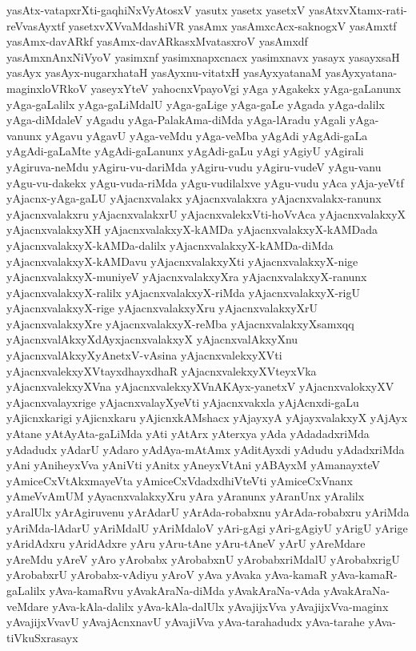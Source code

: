 {yasAtx-vatapxrXti-gaqhiNxVyAtosxV
yasutx
yasetx
yasetxV
yasAtxvXtamx-rati-reVvasAyxtf
yasetxvXVvaMdashiVR
yasAmx
yasAmxcAcx-saknogxV
yasAmxtf
yasAmx-davARkf
yasAmx-davARkasxMvatasxroV
yasAmxdf
yasAmxnAnxNiVyoV
yasimxnf
yasimxnapxcnacx
yasimxnavx
yasayx
yasayxsaH
yasAyx
yasAyx-nugarxhataH
yasAyxnu-vitatxH
yasAyxyatanaM
yasAyxyatana-maginxloVRkoV
yaseyxYteV
yahocnxVpayoVgi
yAga
yAgakekx
yAga-gaLanunx
yAga-gaLalilx
yAga-gaLiMdalU
yAga-gaLige
yAga-gaLe
yAgada
yAga-dalilx
yAga-diMdaleV
yAgadu
yAga-PalakAma-diMda
yAga-lAradu
yAgali
yAga-vanunx
yAgavu
yAgavU
yAga-veMdu
yAga-veMba
yAgAdi
yAgAdi-gaLa
yAgAdi-gaLaMte
yAgAdi-gaLanunx
yAgAdi-gaLu
yAgi
yAgiyU
yAgirali
yAgiruva-neMdu
yAgiru-vu-dariMda
yAgiru-vudu
yAgiru-vudeV
yAgu-vanu
yAgu-vu-dakekx
yAgu-vuda-riMda
yAgu-vudilalxve
yAgu-vudu
yAca
yAja-yeVtf
yAjacnx-yAga-gaLU
yAjacnxvalakx
yAjacnxvalakxra
yAjacnxvalakx-ranunx
yAjacnxvalakxru
yAjacnxvalakxrU
yAjacnxvalekxVti-hoVvAca
yAjacnxvalakxyX
yAjacnxvalakxyXH
yAjacnxvalakxyX-kAMDa
yAjacnxvalakxyX-kAMDada
yAjacnxvalakxyX-kAMDa-dalilx
yAjacnxvalakxyX-kAMDa-diMda
yAjacnxvalakxyX-kAMDavu
yAjacnxvalakxyXti
yAjacnxvalakxyX-nige
yAjacnxvalakxyX-muniyeV
yAjacnxvalakxyXra
yAjacnxvalakxyX-ranunx
yAjacnxvalakxyX-ralilx
yAjacnxvalakxyX-riMda
yAjacnxvalakxyX-rigU
yAjacnxvalakxyX-rige
yAjacnxvalakxyXru
yAjacnxvalakxyXrU
yAjacnxvalakxyXre
yAjacnxvalakxyX-reMba
yAjacnxvalakxyXsamxqq
yAjacnxvalAkxyXdAyxjacnxvalakxyX
yAjacnxvalAkxyXnu
yAjacnxvalAkxyXyAnetxV-vAsina
yAjacnxvalekxyXVti
yAjacnxvalekxyXVtayxdhayxdhaR
yAjacnxvalekxyXVteyxVka
yAjacnxvalekxyXVna
yAjacnxvalekxyXVnAKAyx-yanetxV
yAjacnxvalokxyXV
yAjacnxvalayxrige
yAjacnxvalayXyeVti
yAjacnxvakxla
yAjAcnxdi-gaLu
yAjicnxkarigi
yAjicnxkaru
yAjicnxkAMshacx
yAjayxyA
yAjayxvalakxyX
yAjAyx
yAtane
yAtAyAta-gaLiMda
yAti
yAtArx
yAterxya
yAda
yAdadadxriMda
yAdadudx
yAdarU
yAdaro
yAdAya-mAtAmx
yAditAyxdi
yAdudu
yAdadxriMda
yAni
yAniheyxVva
yAniVti
yAnitx
yAneyxVtAni
yABAyxM
yAmanayxteV
yAmiceCxVtAkxmayeVta
yAmiceCxVdadxdhiVteVti
yAmiceCxVnanx
yAmeVvAmUM
yAyacnxvalakxyXru
yAra
yAranunx
yAranUnx
yAralilx
yAralUlx
yArAgiruvenu
yArAdarU
yArAda-robabxnu
yArAda-robabxru
yAriMda
yAriMda-lAdarU
yAriMdalU
yAriMdaloV
yAri-gAgi
yAri-gAgiyU
yArigU
yArige
yAridAdxru
yAridAdxre
yAru
yAru-tAne
yAru-tAneV
yArU
yAreMdare
yAreMdu
yAreV
yAro
yArobabx
yArobabxnU
yArobabxriMdalU
yArobabxrigU
yArobabxrU
yArobabx-vAdiyu
yAroV
yAva
yAvaka
yAva-kamaR
yAva-kamaR-gaLalilx
yAva-kamaRvu
yAvakAraNa-diMda
yAvakAraNa-vAda
yAvakAraNa-veMdare
yAva-kAla-dalilx
yAva-kAla-dalUlx
yAvajijxVva
yAvajijxVva-maginx
yAvajijxVvavU
yAvajAcnxnavU
yAvajiVva
yAva-tarahadudx
yAva-tarahe
yAva-tiVkuSxrasayx
}
